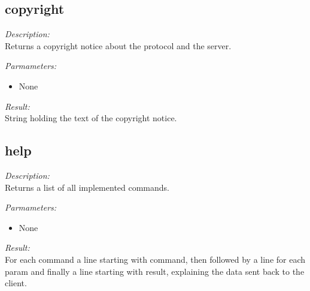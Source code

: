 \subsection{copyright}

\begin{description}
\item {\it Description:}\\
Returns a copyright notice about the protocol and the server.
\item {\it Parmameters:}
\begin{itemize}
\item None
\end{itemize}
\item {\it Result:}\\
String holding the text of the copyright notice.
\end{description}

\subsection{help}

\begin{description}
\item {\it Description:}\\
Returns a list of all implemented commands.
\item {\it Parmameters:}
\begin{itemize}
\item None
\end{itemize}
\item {\it Result:}\\
For each command a line starting with command, then followed by a line for each param and finally a line starting with result, explaining the data sent back to the client.
\end{description}

